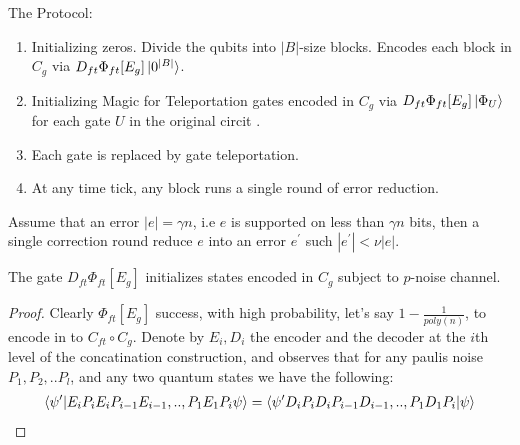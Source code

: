 \documentclass[manuscript,screen,review]{acmart}
\begin{document}
The Protocol:
\begin{enumerate}
  \item Initializing zeros. Divide the qubits into $|B|$-size blocks. Encodes each block in $C_{g}$ via $D_{ft} \Phi_{ft}[E_{g}] \ket{0^{|B|}}$.
  \item Initializing Magic for Teleportation gates encoded in $C_{g}$ via $D_{ft} \Phi_{ft}[E_{g}] \ket{\Phi_{U}}$ for each gate $U$ in the original circit .
  \item Each gate is replaced by gate teleportation.  
  \item At any time tick, any block runs a single round of error reduction.  
\end{enumerate}


\begin{claim}
  \label{claim:error} 
  Assume that an error $|e| = \gamma n $, i.e $e$ is supported on less than $\gamma n$ bits, then a single correction round reduce $e$ into an error $e^\prime$ such $|e^{\prime}| < \nu |e|$. 
\end{claim}


\begin{claim}
  The gate $ D_{ft} \Phi_{ft}[E_{g}]$ initializes states encoded in $C_{g}$ subject to $p$-noise channel.  
\end{claim}
\begin{proof}
  Clearly $\Phi_{ft}[E_{g}]$ success, with high probability, let's say $1 - \frac{1}{poly(n)}$, to encode in to $ C_{ft} \circ C_{g}$. Denote by $E_{i}, D_{i}$ the encoder and the decoder at the $i$th level of the concatination construction, and observes that for any paulis noise $P_{1},P_{2},..P_{l}$, and any two quantum states we have the following:  
  \begin{equation*}
    \begin{split}
      \braket{ \psi^{\prime} | E_{i}P_{i}E_{i}P_{i-1}E_{i-1},..,P_{1}E_{1}P_{i} \psi } = \braket{ \psi^{\prime} D_{i}P_{i}D_{i}P_{i-1}D_{i-1},..,P_{1}D_{1}P_{i} | \psi }
    \end{split}
  \end{equation*}
\end{proof}
\end{document}
